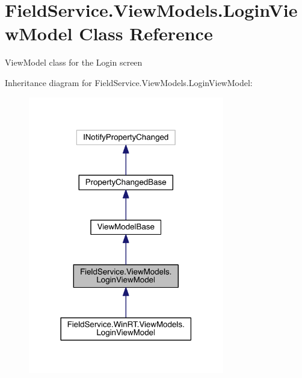 \hypertarget{class_field_service_1_1_view_models_1_1_login_view_model}{\section{Field\+Service.\+View\+Models.\+Login\+View\+Model Class Reference}
\label{class_field_service_1_1_view_models_1_1_login_view_model}
}


View\+Model class for the Login screen  




Inheritance diagram for Field\+Service.\+View\+Models.\+Login\+View\+Model\+:
\nopagebreak
\begin{figure}[H]
\begin{center}
\leavevmode
\includegraphics[width=242pt]{class_field_service_1_1_view_models_1_1_login_view_model__inherit__graph}
\end{center}
\end{figure}


